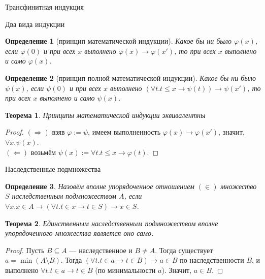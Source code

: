 \documentclass[aspectratio=169]{beamer}
\newtheorem{thm}{Теорема}[section]
\newtheorem{dfn}{Определение}[section]
\begin{document}
\newcommand\doubleplus{+\kern-1.3ex+\kern0.8ex}
\newcommand\mdoubleplus{\ensuremath{\mathbin{+\mkern-10mu+}}}

\begin{frame}{}
\LARGE\begin{center}Трансфинитная индукция\end{center}
\end{frame}

\begin{frame}{Два вида индукции}
\begin{dfn}[принцип математической индукции]
Какое бы ни было $\varphi(x)$, если $\varphi(0)$ и при всех $x$ выполнено $\varphi(x)\rightarrow \varphi(x')$, то
при всех $x$ выполнено и само $\varphi(x)$.
\end{dfn}

\begin{dfn}[принцип полной математической индукции]
Какое бы ни было $\psi(x)$, если $\psi(0)$ и при всех $x$ выполнено $(\forall t.t \leq x \rightarrow \psi(t))\rightarrow \psi(x')$, то
при всех $x$ выполнено и само $\psi(x)$.
\end{dfn}

\begin{thm}Принципы математической индукции эквивалентны\end{thm}
\begin{proof}
$(\Rightarrow)$ взяв $\varphi := \psi$, имеем выполненность $\varphi(x)\rightarrow\varphi(x')$, значит, $\forall x.\psi(x)$. \pause\\
$(\Leftarrow)$ возьмём $\psi(x) := \forall t.t\le x\rightarrow\varphi(t)$.
\end{proof}
\end{frame}

\begin{frame}{Наследственные подмножества}
\begin{dfn} Назовём вполне упорядоченное отношением $(\in)$ множество $S$ наследственным подмножеством $A$, если 
$\forall x.x \in A \rightarrow (\forall t.t \in x \rightarrow t \in S) \rightarrow x \in S$.
\end{dfn}
\begin{thm}Единственным наследственным подмножеством вполне упорядоченного множества является оно само.\end{thm}
\begin{proof}Пусть $B \subseteq A$ --- наследственное и $B \ne A$.
Тогда существует $a = \min (A \setminus B)$. Тогда $(\forall t.t \in a \rightarrow t \in B) \rightarrow a \in B$ по наследственности $B$,
и выполнено $\forall t.t \in a \rightarrow t \in B$ (по минимальности $a$). Значит, $a \in B$.
\end{proof}
\end{frame}
\end{document}
